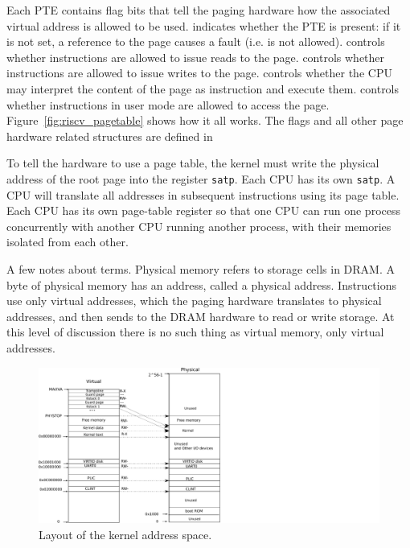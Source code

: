 Each PTE contains flag bits that tell the paging hardware
how the associated virtual address is allowed to be used.
indicates whether the PTE is present: if it is
not set, a reference to the page causes a fault (i.e. is not allowed).
controls whether instructions are allowed to issue
reads to the page.
controls whether instructions are allowed to issue
writes to the page.
controls whether the CPU may interpret the content
of the page as instruction and execute them.
controls whether instructions in user mode are allowed
to access the page.
Figure~\ref{fig:riscv_pagetable}
shows how it all works.
The flags and all other page hardware related structures are defined in

To tell the hardware to use a page table, the kernel must
write the physical address of the root page into the register
\texttt{satp}.
Each CPU has its own
\texttt{satp}.
A CPU will translate all addresses in subsequent instructions
using its page table.
Each CPU has its own page-table register so that one CPU
can run one process concurrently with another CPU running
another process, with their memories isolated from each other.

A few notes about terms.
Physical memory refers to storage cells in DRAM.
A byte of physical memory has an address, called a physical address.
Instructions use only virtual addresses, which the
paging hardware translates to physical addresses, and then
sends to the DRAM hardware to read or write storage.
At this level of discussion there is no such thing as virtual memory,
only virtual addresses.

\begin{figure}[t]
\center
\includegraphics[scale=0.7]{fig/xv6_layout.pdf}
\caption{Layout of the kernel address space.}
\label{fig:xv6_layout}
\end{figure}
